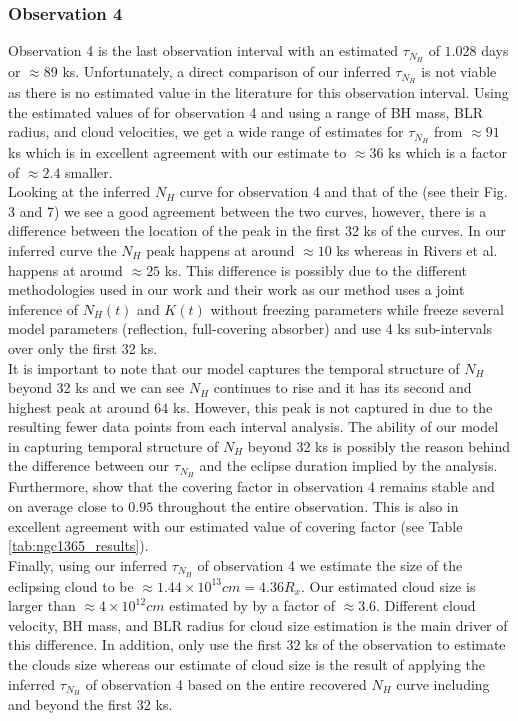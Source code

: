 \documentclass{aa}
\begin{document}
\subsubsection*{Observation 4}
Observation 4 is the last observation interval with an estimated $\tau_{N_H}$ of $1.028$ days or $\approx 89$ ks. Unfortunately, a direct comparison of our inferred $\tau_{N_H}$ is not viable as there is no estimated value in the literature for this observation interval. Using the estimated values of \citet{Rivers2015} for observation 4 and using a range of BH mass, BLR radius, and cloud velocities, we get a wide range of estimates for $\tau_{N_H}$ from $\approx 91$ ks which is in excellent agreement with our estimate to $\approx 36$ ks which is a factor of $\approx 2.4$ smaller. \\
Looking at the inferred $N_H$ curve for observation 4 and that of the \citet{Rivers2015} (see their Fig. 3 and 7) we see a good agreement between the two curves, however, there is a difference between the location of the peak in the first 32 ks of the curves. In our inferred curve the $N_H$ peak happens at around $\approx 10$ ks whereas in Rivers et al. happens at around $\approx 25$ ks. This difference is possibly due to the different methodologies used in our work and their work as our method uses a joint inference of $N_H(t)$ and $K(t)$ without freezing parameters while \citet{Rivers2015} freeze several model parameters (reflection, full-covering absorber) and use 4 ks sub-intervals over only the first 32 ks. \\
It is important to note that our model captures the temporal structure of $N_H$ beyond 32 ks and we can see $N_H$ continues to rise and it has its second and highest peak at around $64$ ks. However, this peak is not captured in \citet{Rivers2015} due to the resulting fewer data points from each interval analysis. The ability of our model in capturing temporal structure of $N_H$ beyond 32 ks is possibly the reason behind the difference between our $\tau_{N_H}$ and the eclipse duration implied by the \citet{Rivers2015} analysis. \\
Furthermore, \citet{Rivers2015} show that the covering factor in observation 4 remains stable and on average close to $0.95$ throughout the entire observation. This is also in excellent agreement with our estimated value of covering factor (see Table \ref{tab:ngc1365_results}). \\
Finally, using our inferred $\tau_{N_H}$ of observation 4 we estimate the size of the eclipsing cloud to be $\approx 1.44 \times 10^{13} cm  = 4.36 R_x$. Our estimated cloud size is larger than $\approx 4 \times 10^{12} cm$ estimated by \citet{Rivers2015} by a factor of $\approx 3.6$. Different cloud velocity, BH mass, and BLR radius for cloud size estimation is the main driver of this difference. In addition, \citet{Rivers2015} only use the first $32$ ks of the observation to estimate the clouds size whereas our estimate of cloud size is the result of applying the inferred $\tau_{N_H}$ of observation 4 based on the entire recovered $N_H$ curve including and beyond the first $32$ ks. \\
\end{document}

